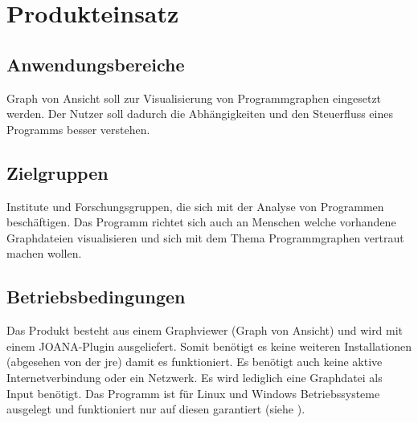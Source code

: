 \chapter{Produkteinsatz}

\section{Anwendungsbereiche}
Graph von Ansicht soll zur Visualisierung von Programmgraphen eingesetzt werden. Der Nutzer soll dadurch die Abhängigkeiten und den Steuerfluss eines Programms besser verstehen.
\section{Zielgruppen}
Institute und Forschungsgruppen, die sich mit der Analyse von Programmen beschäftigen. Das Programm richtet sich auch an Menschen welche vorhandene Graphdateien visualisieren und sich mit dem Thema Programmgraphen vertraut machen wollen.

\section{Betriebsbedingungen}
Das Produkt besteht aus einem Graphviewer (Graph von Ansicht) und wird mit einem JOANA-Plugin ausgeliefert. Somit benötigt es keine weiteren Installationen (abgesehen von der \gls{jre}) damit es funktioniert. Es benötigt auch keine aktive Internetverbindung oder ein Netzwerk. Es wird lediglich eine Graphdatei als Input benötigt. Das Programm ist für Linux und Windows Betriebssysteme ausgelegt und funktioniert nur auf diesen garantiert (siehe ).
